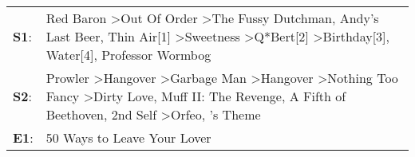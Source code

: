 \begin{supertabular}{p{0.03\textwidth}p{0.92\textwidth}}
 \textbf{S1}:  &                                               Red Baron\textsuperscript{} \textgreater \enspace Out Of Order\textsuperscript{} \textgreater \enspace The Fussy Dutchman\textsuperscript{}, \enspace Andy's Last Beer\textsuperscript{}, \enspace Thin Air[1]\textsuperscript{} \textgreater \enspace Sweetness\textsuperscript{} \textgreater \enspace Q*Bert[2]\textsuperscript{} \textgreater \enspace Birthday[3]\textsuperscript{}, \enspace Water[4]\textsuperscript{}, \enspace Professor Wormbog\textsuperscript{}  \enspace  \\
 \textbf{S2}:  &  Prowler\textsuperscript{} \textgreater \enspace Hangover\textsuperscript{} \textgreater \enspace Garbage Man\textsuperscript{} \textgreater \enspace Hangover\textsuperscript{} \textgreater \enspace Nothing Too Fancy\textsuperscript{} \textgreater \enspace Dirty Love\textsuperscript{}, \enspace Muff II: The Revenge\textsuperscript{}, \enspace A Fifth of Beethoven\textsuperscript{}, \enspace 2nd Self\textsuperscript{} \textgreater \enspace Orfeo\textsuperscript{}, 's Theme\textsuperscript{}  \enspace  \\
 \textbf{E1}:  &                                                                                                                                                                                                                                                                                                                                                                                                                                                                             50 Ways to Leave Your Lover\textsuperscript{}  \enspace  \\
\end{supertabular}
